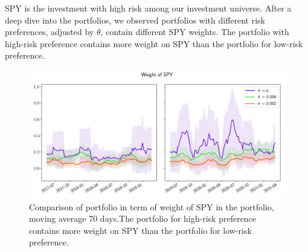 \par
SPY is the investment with high risk among our investment universe. After a deep dive into the portfolios, we observed portfolios with different risk preferences, adjusted by $\theta$, contain different SPY weights. The portfolio with high-risk preference contains more weight on SPY than the portfolio for low-risk preference.
\begin{figure}[htb]
\centering
  \includegraphics[width=16cm]{images/spy_weight.png}
  \caption [Comparison of portfolio in term of weight of SPY]{Comparison of portfolio in term of weight of SPY in the portfolio, moving average 70 days.The portfolio for high-risk preference contains more weight on SPY than the portfolio for low-risk preference.
  }
  \label{fig:crp_compare}
\end{figure}